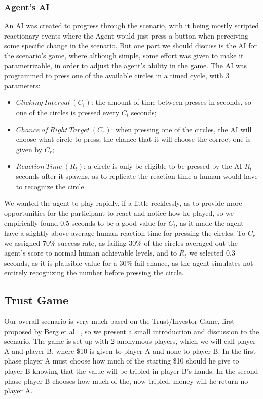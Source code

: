 \subsubsection{Agent's \ac{AI}}
An \ac{AI} was created to progress through the scenario, with it being mostly scripted reactionary events where the Agent would just press a button when perceiving some specific change in the scenario. But one part we should discuss is the \ac{AI} for the scenario's game, where although simple, some effort was given to make it parametrizable, in order to adjust the agent's ability in the game. The \ac{AI} was programmed to press one of the available circles in a timed cycle, with 3 parameters:
\begin{itemize}
    \item $Clicking\ Interval\ (C_i)$: the amount of time between presses in seconds, so one of the circles is pressed every $C_i$ seconds;
    \item $Chance\ of\ Right\ Target\ (C_r)$: when pressing one of the circles, the \ac{AI} will choose what circle to press, the chance that it will choose the correct one is given by $C_r$;
    \item $Reaction\ Time\ (R_t)$: a circle is only be eligible to be pressed by the \ac{AI} $R_t$ seconds after it spawns, as to replicate the reaction time a human would have to recognize the circle.
\end{itemize} 
We wanted the agent to play rapidly, if a little recklessly, as to provide more opportunities for the participant to react and notice how he played, so we empirically found 0.5 seconds to be a good value for $C_i$, as it made the agent have a slightly above average human reaction time for pressing the circles. To $C_r$ we assigned 70\% success rate, as failing 30\% of the circles averaged out the agent's score to normal human achievable levels, and to $R_t$ we selected 0.3 seconds, as it is plausible value for a 30\% fail chance, as the agent simulates not entirely recognizing the number before pressing the circle.

\subsection{Trust Game}
\label{subsec:Trustgame}
Our overall scenario is very much based on the Trust/Investor Game, first proposed by Berg et al.~\cite{JoyceBergJohnDickhaut}, so we present a small introduction and discussion to the scenario. The game is set up with 2 anonymous players, which we will call player A and player B, where \$10 is given to player A and none to player B. In the first phase player A must choose how much of the starting \$10 should he give to player B knowing that the value will be tripled in player B’s hands. In the second phase player B chooses how much of the, now tripled, money will he return no player A.

